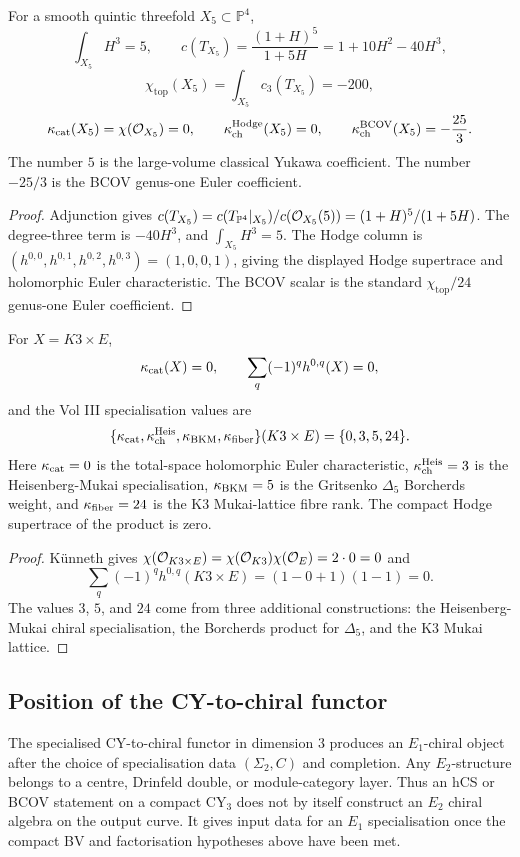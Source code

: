 \begin{proposition}
\label{prop:bcov-yukawa-quintic-constants}
For a smooth quintic threefold $X_5\subset\mathbb P^4$,
\[
\int_{X_5}H^3=5,\qquad
c(T_{X_5})=\frac{(1+H)^5}{1+5H}=1+10H^2-40H^3,
\]
\[
\chi_{\mathrm{top}}(X_5)=\int_{X_5}c_3(T_{X_5})=-200,
\]
\[
\kappa_{\mathrm{cat}}(X_5)=\chi(\mathcal{O}_{X_5})=0,\qquad
\kappa_{\mathrm{ch}}^{\mathrm{Hodge}}(X_5)=0,\qquad
\kappa_{\mathrm{ch}}^{\mathrm{BCOV}}(X_5)=-\frac{25}{3}.
\]
The number $5$ is the large-volume classical Yukawa coefficient. The
number $-25/3$ is the BCOV genus-one Euler coefficient.
\end{proposition}

\begin{proof}
Adjunction gives
$c(T_{X_5})=c(T_{\mathbb P^4}|_{X_5})/c(\mathcal{O}_{X_5}(5))=(1+H)^5/(1+5H)$.
The degree-three term is $-40H^3$, and $\int_{X_5}H^3=5$. The Hodge
column is $(h^{0,0},h^{0,1},h^{0,2},h^{0,3})=(1,0,0,1)$, giving the
displayed Hodge supertrace and holomorphic Euler characteristic. The
BCOV scalar is the standard $\chi_{\mathrm{top}}/24$ genus-one Euler
coefficient.
\end{proof}

\begin{proposition}
\label{prop:bcov-yukawa-k3e-constants}
For $X=K3\times E$,
\[
\kappa_{\mathrm{cat}}(X)=0,\qquad
\sum_q(-1)^qh^{0,q}(X)=0,
\]
and the Vol III specialisation values are
\[
\{\kappa_{\mathrm{cat}},\kappa_{\mathrm{ch}}^{\mathrm{Heis}},\kappa_{\mathrm{BKM}},\kappa_{\mathrm{fiber}}\}(K3\times E)=\{0,3,5,24\}.
\]
Here $\kappa_{\mathrm{cat}}=0$ is the total-space holomorphic Euler characteristic,
$\kappa_{\mathrm{ch}}^{\mathrm{Heis}}=3$ is the Heisenberg-Mukai specialisation, $\kappa_{\mathrm{BKM}}=5$ is the
Gritsenko $\Delta_5$ Borcherds weight, and $\kappa_{\mathrm{fiber}}=24$ is the K3
Mukai-lattice fibre rank. The compact Hodge supertrace of the product is
zero.
\end{proposition}

\begin{proof}
K\"unneth gives
$\chi(\mathcal{O}_{K3\times E})=\chi(\mathcal{O}_{K3})\chi(\mathcal{O}_E)=2\cdot0=0$ and
\[
\sum_q(-1)^qh^{0,q}(K3\times E)
=(1-0+1)(1-1)=0.
\]
The values $3$, $5$, and $24$ come from three additional constructions:
the Heisenberg-Mukai chiral specialisation, the Borcherds product for
$\Delta_5$, and the K3 Mukai lattice.
\end{proof}

\subsection*{Position of the CY-to-chiral functor}
\label{subsec:bcov-yukawa-phi3}

The specialised CY-to-chiral functor in dimension $3$ produces an
$E_1$-chiral object after the choice of specialisation data
$(\Sigma_2,C)$ and completion. Any $E_2$-structure belongs to a centre,
Drinfeld double, or module-category layer. Thus an hCS or BCOV statement
on a compact CY$_3$ does not by itself construct an $E_2$ chiral algebra
on the output curve. It gives input data for an $E_1$ specialisation once
the compact BV and factorisation hypotheses above have been met.

